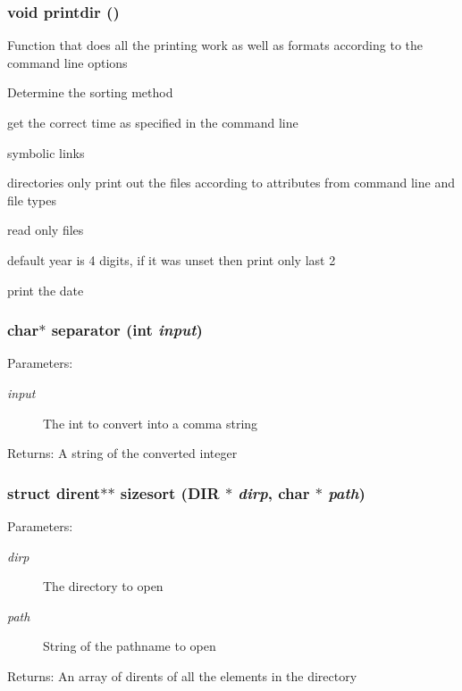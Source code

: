 \subsubsection{\setlength{\rightskip}{0pt plus 5cm}void printdir ()}\label{dir_8c_c92ccf131b6252a18153ea39ca6786ed}


Function that does all the printing work as well as formats according to the command line options

Determine the sorting method

get the correct time as specified in the command line

symbolic links

directories only print out the files according to attributes from command line and file types

read only files

default year is 4 digits, if it was unset then print only last 2

print the date 
\subsubsection{\setlength{\rightskip}{0pt plus 5cm}char$\ast$ separator (int {\em input})}\label{dir_8c_39dc54c3a499efadd208cc6482f2034f}


\begin{Desc}
\item[Parameters:]
\begin{description}
\item[{\em input}]The int to convert into a comma string \end{description}
\end{Desc}
\begin{Desc}
\item[Returns:]A string of the converted integer \end{Desc}
\subsubsection{\setlength{\rightskip}{0pt plus 5cm}struct dirent$\ast$$\ast$ sizesort (DIR $\ast$ {\em dirp}, char $\ast$ {\em path})}\label{dir_8c_57b505a098447a3e63c6f3528cfe7508}


\begin{Desc}
\item[Parameters:]
\begin{description}
\item[{\em dirp}]The directory to open \item[{\em path}]String of the pathname to open \end{description}
\end{Desc}
\begin{Desc}
\item[Returns:]An array of dirents of all the elements in the directory \end{Desc}
